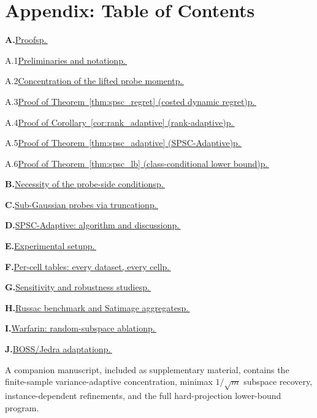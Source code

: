 \documentclass{article}
\begin{document}



\clearpage
\appendix

\section*{Appendix: Table of Contents}
\label{app:toc}

\begingroup
\hypersetup{linkcolor=blue}

\newcommand{\tocentry}[3]{%
  \noindent\textbf{#1.}\;\hyperref[#2]{#3}\dotfill\hyperref[#2]{p.\,\pageref*{#2}}\par\vspace{2pt}%
}
\newcommand{\tocsubentry}[3]{%
  \noindent\hspace{1.2em}#1\;\hyperref[#2]{#3}\dotfill\hyperref[#2]{p.\,\pageref*{#2}}\par\vspace{1pt}%
}

\tocentry{A}{app:proofs}{Proofs}
  \tocsubentry{A.1}{app:prelim}{Preliminaries and notation}
  \tocsubentry{A.2}{app:concentration_proof}{Concentration of the lifted probe moment}
  \tocsubentry{A.3}{app:proof_main}{Proof of Theorem~\ref{thm:spsc_regret} (costed dynamic regret)}
  \tocsubentry{A.4}{app:proof_adaptive_rank}{Proof of Corollary~\ref{cor:rank_adaptive} (rank-adaptive)}
  \tocsubentry{A.5}{app:proof_adaptive}{Proof of Theorem~\ref{thm:spsc_adaptive} (SPSC-Adaptive)}
  \tocsubentry{A.6}{app:proof_lb}{Proof of Theorem~\ref{thm:spsc_lb} (class-conditional lower bound)}
\tocentry{B}{app:necessity}{Necessity of the probe-side conditions}
\tocentry{C}{app:truncation}{Sub-Gaussian probes via truncation}
\tocentry{D}{app:adaptive_algo}{SPSC-Adaptive: algorithm and discussion}
\tocentry{E}{app:setup}{Experimental setup}
\tocentry{F}{app:percell}{Per-cell tables: every dataset, every cell}
\tocentry{G}{app:sensitivity}{Sensitivity and robustness studies}
\tocentry{H}{app:sota_compare}{Russac benchmark and Satimage aggregates}
\tocentry{I}{app:warfarin_ablation}{Warfarin: random-subspace ablation}
\tocentry{J}{app:boss_jedra_detail}{BOSS/Jedra adaptation}

\endgroup

\vspace{0.5em}
\noindent
A companion manuscript, included as supplementary material, contains
the finite-sample variance-adaptive concentration, minimax
$1/\sqrt m$ subspace recovery, instance-dependent refinements, and
the full hard-projection lower-bound program.
\end{document}
